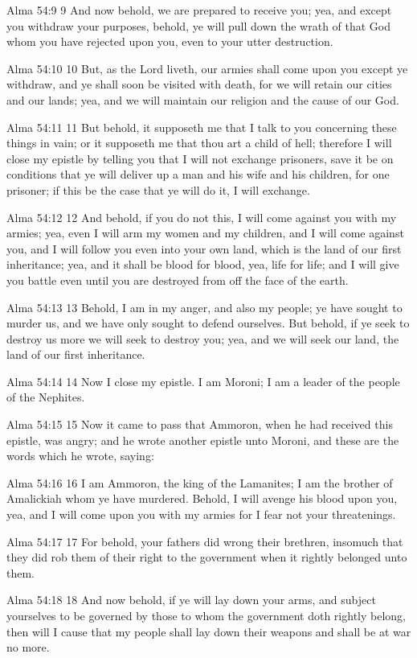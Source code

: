Alma 54:9
 9 And now behold, we are prepared to receive you; yea, and
except you withdraw your purposes, behold, ye will pull down the
wrath of that God whom you have rejected upon you, even to your
utter destruction.

Alma 54:10
 10 But, as the Lord liveth, our armies shall come upon you
except ye withdraw, and ye shall soon be visited with death, for
we will retain our cities and our lands; yea, and we will
maintain our religion and the cause of our God.

Alma 54:11
 11 But behold, it supposeth me that I talk to you concerning
these things in vain; or it supposeth me that thou art a child of
hell; therefore I will close my epistle by telling you that I
will not exchange prisoners, save it be on conditions that ye
will deliver up a man and his wife and his children, for one
prisoner; if this be the case that ye will do it, I will
exchange.

Alma 54:12
 12 And behold, if you do not this, I will come against you with
my armies; yea, even I will arm my women and my children, and I
will come against you, and I will follow you even into your own
land, which is the land of our first inheritance; yea, and it
shall be blood for blood, yea, life for life; and I will give you
battle even until you are destroyed from off the face of the
earth.

Alma 54:13
 13 Behold, I am in my anger, and also my people; ye have sought
to murder us, and we have only sought to defend ourselves. But
behold, if ye seek to destroy us more we will seek to destroy
you; yea, and we will seek our land, the land of our first
inheritance.

Alma 54:14
 14 Now I close my epistle. I am Moroni; I am a leader of the
people of the Nephites.

Alma 54:15
 15 Now it came to pass that Ammoron, when he had received this
epistle, was angry; and he wrote another epistle unto Moroni, and
these are the words which he wrote, saying:

Alma 54:16
 16 I am Ammoron, the king of the Lamanites; I am the brother of
Amalickiah whom ye have murdered. Behold, I will avenge his
blood upon you, yea, and I will come upon you with my armies for
I fear not your threatenings.

Alma 54:17
 17 For behold, your fathers did wrong their brethren, insomuch
that they did rob them of their right to the government when it
rightly belonged unto them.

Alma 54:18
 18 And now behold, if ye will lay down your arms, and subject
yourselves to be governed by those to whom the government doth
rightly belong, then will I cause that my people shall lay down
their weapons and shall be at war no more.

